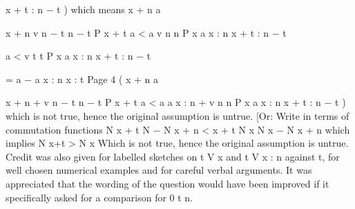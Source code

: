 \documentclass[a4paper,12pt]{article}
\begin{document}
x + t : n − t
)
which means
 x + n a


 x + n
v n − t n − t P x + t a
< a
v n n P x a
x : n
x + t : n − t


a
< v t t P x a
x : n
x + t : n − t


= a
− a
x : n
x : t
Page 4
(
 x + n a


 x + n
+ v n − t n − t P x + t a
< a
a  x : n + v n n P x a
x : n
x + t : n − t
)%
which is not true, hence the original assumption is untrue.
[Or: Write in terms of commutation functions
N x + t
N − N x + n
< x + t
N x
N x − N x + n
which implies
N x+t > N x
Which is not true, hence the original assumption is untrue.
Credit was also given for labelled sketches on t V x and t V x : n against t, for well
chosen numerical examples and for careful verbal arguments.
It was appreciated that the wording of the question would have been improved if it
specifically asked for a comparison for 0 \leq t \leq n.
\end{document}
